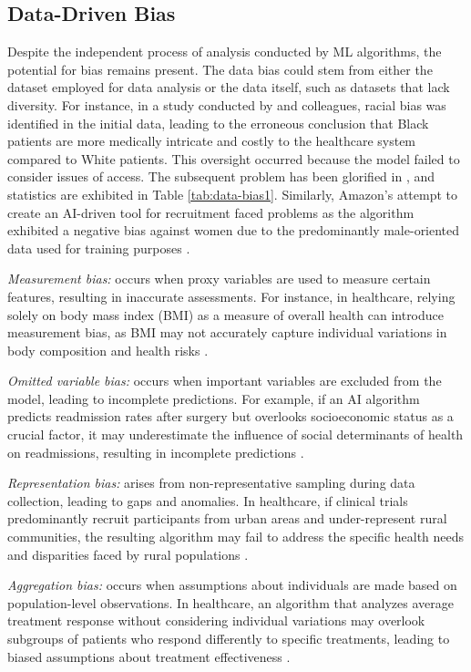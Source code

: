 \documentclass{article}
\begin{document}
\subsection{Data-Driven Bias}
Despite the independent process of analysis conducted by ML algorithms, the potential for bias remains present. The data bias could stem from either the dataset employed for data analysis or the data itself, such as datasets that lack diversity. For instance, in a study conducted by \cite{obermeyer2019dissecting} and colleagues, racial bias was identified in the initial data, leading to the erroneous conclusion that Black patients are more medically intricate and costly to the healthcare system compared to White patients. This oversight occurred because the model failed to consider issues of access. The subsequent problem has been glorified in \cite{buolamwini2018gender}, and statistics are exhibited in Table \ref{tab:data-bias1}. Similarly, Amazon's attempt to create an AI-driven tool for recruitment faced problems as the algorithm exhibited a negative bias against women due to the predominantly male-oriented data used for training purposes \cite{topol2019high}.

\emph{Measurement bias:} occurs when proxy variables are used to measure certain features, resulting in inaccurate assessments. For instance, in healthcare, relying solely on body mass index (BMI) as a measure of overall health can introduce measurement bias, as BMI may not accurately capture individual variations in body composition and health risks \cite{suresh2021framework}.

\emph{Omitted variable bias:} occurs when important variables are excluded from the model, leading to incomplete predictions. For example, if an AI algorithm predicts readmission rates after surgery but overlooks socioeconomic status as a crucial factor, it may underestimate the influence of social determinants of health on readmissions, resulting in incomplete predictions \cite{riegg2008causal}.

\emph{Representation bias:} arises from non-representative sampling during data collection, leading to gaps and anomalies. In healthcare, if clinical trials predominantly recruit participants from urban areas and under-represent rural communities, the resulting algorithm may fail to address the specific health needs and disparities faced by rural populations \cite{suresh2021framework}.

\emph{Aggregation bias:} occurs when assumptions about individuals are made based on population-level observations. In healthcare, an algorithm that analyzes average treatment response without considering individual variations may overlook subgroups of patients who respond differently to specific treatments, leading to biased assumptions about treatment effectiveness \cite{suresh2021framework}.
\end{document}
